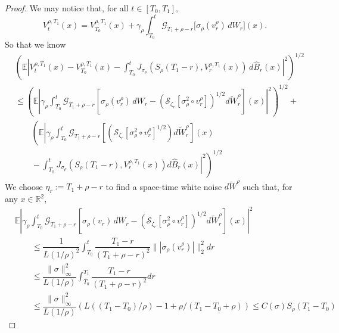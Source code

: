\begin{proof}
    We may notice that, for all
\(t \in [T_0,T_1]\),
\begin{equation*}
V_t^{\rho,T_1}(x)
=
V_{T_0}^{\rho,T_1}(x)
+
\gamma_{\rho}\int_{T_0}^{t}
\mathcal{G}_{T_1+\rho-r}
\bigl[\sigma_{\rho}(v_r^{\rho})\,dW_r\bigr](x).
\end{equation*}
So that we know
\[
\begin{aligned}
    &\left(\mathbb{E}
\left|
V_t^{\rho,T_1}(x)
-
V_{T_0}^{\rho,T_1}(x)
-
\int_{T_0}^{t}
J_{\sigma_{\rho}}\left(
    S_{\rho}(T_1-r),
    V_r^{\rho,T_1}(x)
\right)
\,d\widehat{B}_r(x)
\right|^2\right)^{1/2} \\
&\leq 
\left(\mathbb{E}
\left|
\gamma_\rho
\int_{T_0}^{t}
\mathcal{G}_{T_1+\rho-r}
\left[
 \sigma_{\rho}(v_r^{\rho})\,dW_r
 -
 \left(\mathcal{S}_{\zeta_r}
       [\sigma_{\rho}^2\circ v_r^{\rho}]\right)^{1/2}
 d\widetilde W_r^{\rho}
\right](x)
\right|^2\right)^{1/2} + \\
&\qquad\left(\mathbb{E}\left|
\gamma_{\rho}\int_{T_0}^t \mathcal{G}_{T_1+\rho-r}\left[\left(\mathcal{S}_{\zeta_r}[\sigma_{\rho}^2\circ v_r^{\rho}]^{1/2}\right)d\widetilde{W}_r^{\rho}\right](x)\right.\right.\\ &\qquad- \left.\left.\int_{T_0}^t J_{\sigma_{\rho}}(S_{\rho}(T_1-r),V_r^{\rho,T_1}(x))d\widehat{B}_r(x) 
\right|^2\right)^{1/2}
\end{aligned}
\]
We choose
\(\eta_r := T_1+\rho-r\) to find a
space-time white noise \(d\widetilde W^{\rho}\) such that, for any
\(x\in\mathbb{R}^2\),
\begin{align*}
&\mathbb{E}
\left|
\gamma_\rho
\int_{T_0}^{t}
\mathcal{G}_{T_1+\rho-r}
\left[
 \sigma_{\rho}(v_r)\,dW_r
 -
 \left(\mathcal{S}_{\zeta_r}
       [\sigma_{\rho}^2\circ v_r^{\rho}]\right)^{1/2}
 d\widetilde W_r^{\rho}
\right](x)
\right|^2
\nonumber\\
&\qquad\le
\dfrac{1}{L(1/\rho)^2}\int_{T_0}^t\dfrac{T_1-r}{(T_1+\rho-r)^2}\lVert|\sigma_{\rho}(v_r^{\rho})|\rVert_2^2 dr \\
&\qquad\le
\dfrac{\lVert \sigma\rVert_{\infty}^2}{L(1/\rho)}\int_{T_0}^{T_1} \dfrac{T_1-r}{(T_1+\rho-r)^2}dr \\
&\qquad\le
\dfrac{\lVert \sigma\rVert_{\infty}^2}{L(1/\rho)}\left(L((T_1-T_0)/\rho) - 1 + \rho/(T_1-T_0 +\rho)\right)
\leq {C(\sigma)S_{\rho}(T_1-T_0)}
\end{align*}


\end{proof}
